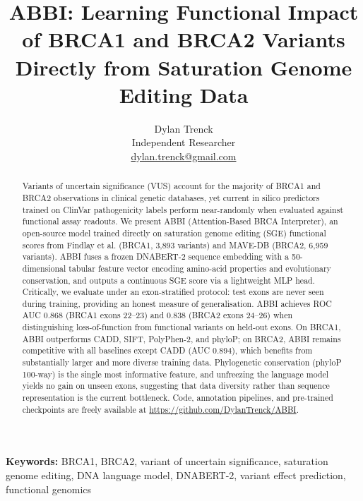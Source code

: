 \documentclass[12pt]{article}
\newcommand{\abbi}{\textsc{ABBI}}
\begin{document}
\title{\textbf{\abbi}: Learning Functional Impact of BRCA1 and BRCA2 Variants\\
       Directly from Saturation Genome Editing Data}

\author{Dylan Trenck\\
        \small Independent Researcher\\
        \small \href{mailto:dylan.trenck@gmail.com}{dylan.trenck@gmail.com}}

\date{}
\maketitle

\begin{abstract}
Variants of uncertain significance (VUS) account for the majority of BRCA1 and BRCA2
observations in clinical genetic databases, yet current in silico predictors trained on
ClinVar pathogenicity labels perform near-randomly when evaluated against functional
assay readouts.
We present \abbi{} (Attention-Based BRCA Interpreter), an open-source model trained
directly on saturation genome editing (SGE) functional scores from Findlay et al. (BRCA1,
3{,}893 variants) and MAVE-DB (BRCA2, 6{,}959 variants).
\abbi{} fuses a frozen DNABERT-2 sequence embedding with a 50-dimensional tabular feature
vector encoding amino-acid properties and evolutionary conservation, and outputs a
continuous SGE score via a lightweight MLP head.
Critically, we evaluate under an exon-stratified protocol: test exons are never seen
during training, providing an honest measure of generalisation.
\abbi{} achieves ROC AUC 0.868 (BRCA1 exons 22--23) and 0.838 (BRCA2 exons 24--26)
when distinguishing loss-of-function from functional variants on held-out exons.
On BRCA1, \abbi{} outperforms CADD, SIFT, PolyPhen-2, and phyloP; on BRCA2, \abbi{}
remains competitive with all baselines except CADD (AUC 0.894), which benefits from
substantially larger and more diverse training data.
Phylogenetic conservation (phyloP 100-way) is the single most informative feature,
and unfreezing the language model yields no gain on unseen exons, suggesting that
data diversity rather than sequence representation is the current bottleneck.
Code, annotation pipelines, and pre-trained checkpoints are freely available at
\url{https://github.com/DylanTrenck/ABBI}.
\end{abstract}

\textbf{Keywords:} BRCA1, BRCA2, variant of uncertain significance, saturation genome  
editing, DNA language model, DNABERT-2, variant effect prediction, functional genomics
\end{document}
